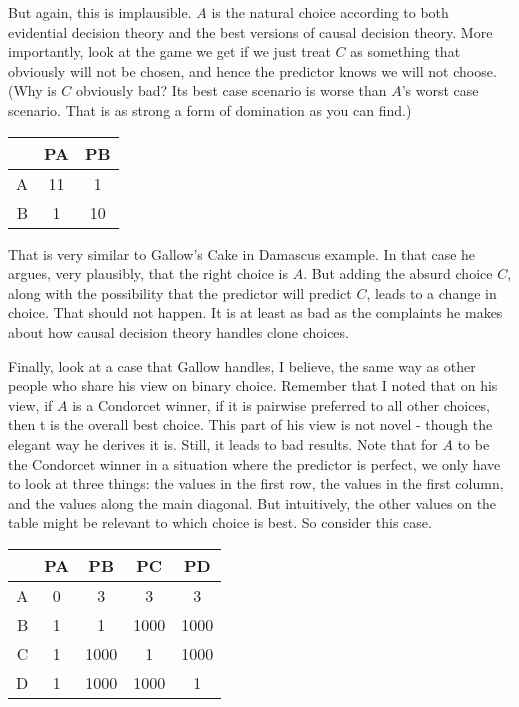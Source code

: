 \documentclass[
  12pt,
]{article}
\begin{document}
But again, this is implausible. \(A\) is the natural choice according to
both evidential decision theory and the best versions of causal decision
theory. More importantly, look at the game we get if we just treat \(C\)
as something that obviously will not be chosen, and hence the predictor
knows we will not choose. (Why is \(C\) obviously bad? Its best case
scenario is worse than \(A\)'s worst case scenario. That is as strong a
form of domination as you can find.)

\begin{table}[!h]
\centering
\begin{tabular}[t]{>{}r|cc}
\toprule
 & PA & PB\\
\midrule
A & 11 & 1\\
B & 1 & 10\\
\bottomrule
\end{tabular}
\end{table}

That is very similar to Gallow's Cake in Damascus example. In that case
he argues, very plausibly, that the right choice is \(A\). But adding
the absurd choice \(C\), along with the possibility that the predictor
will predict \(C\), leads to a change in choice. That should not happen.
It is at least as bad as the complaints he makes about how causal
decision theory handles clone choices.

Finally, look at a case that Gallow handles, I believe, the same way as
other people who share his view on binary choice. Remember that I noted
that on his view, if \(A\) is a Condorcet winner, if it is pairwise
preferred to all other choices, then t is the overall best choice. This
part of his view is not novel - though the elegant way he derives it is.
Still, it leads to bad results. Note that for \(A\) to be the Condorcet
winner in a situation where the predictor is perfect, we only have to
look at three things: the values in the first row, the values in the
first column, and the values along the main diagonal. But intuitively,
the other values on the table might be relevant to which choice is best.
So consider this case.

\begin{table}[!h]
\centering
\begin{tabular}[t]{>{}r|cccc}
\toprule
 & PA & PB & PC & PD\\
\midrule
A & 0 & 3 & 3 & 3\\
B & 1 & 1 & 1000 & 1000\\
C & 1 & 1000 & 1 & 1000\\
D & 1 & 1000 & 1000 & 1\\
\bottomrule
\end{tabular}
\end{table}
\end{document}
